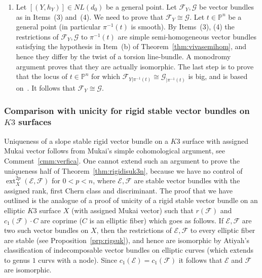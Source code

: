 \documentclass[11pt]{amsart}
\newcommand{\PP}{{\mathbb P}}
\let\mathcal\mathscr
\def\cE{\mathcal{E}}
\def\cF{\mathcal{F}}
\def\cG{\mathcal{G}}
\DeclareMathOperator{\ext}{ext}
\theoremstyle{definition}
\theoremstyle{remark}
\begin{document}
\begin{enumerate}
%
\item
%
Let $[(Y,h_Y)]\in NL(d_0)$ be a general point. Let $\cF_Y,\cG$ be vector bundles  as in Items~(3) and~(4). We need to  prove that $\cF_Y\cong\cG$. Let 
$t\in\PP^n$ be a general point (in particular $\pi^{-1}(t)$ is smooth). By Items~(3), (4) the restrictions of $\cF_Y,\cG$ to $\pi^{-1}(t)$ are simple semi-homogeneous vector bundles satisfying the hypothesis in Item~(b) of Theorem~\ref{thm:vivasemihom}, and hence they differ by the twist of a torsion line-bundle. A monodromy argument proves that they are actually isomorphic. 
The last step is to prove that the locus of $t\in\PP^n$ for which $\cF_{Y|\pi^{-1}(t)}\cong\cG_{|\pi^{-1}(t)}$ is big, and is based 
on~\cite[Lmm.~7.5]{og:fascimod}. It follows that  $\cF_Y\cong\cG$. 
%
\end{enumerate}
%



%
\subsubsection{Comparison with unicity for rigid stable vector bundles on $K3$ surfaces}
%
Uniqueness of a slope stable rigid vector bundle  on a $K3$ surface with assigned Mukai vector follows from Mukai's simple cohomological  argument,  see Comment~\ref{cmm:verfica}. One cannot  extend such an argument to prove the uniqueness half of Theorem~\ref{thm:rigidisuk3n}, because we have no control of $\ext^{2p}_X(\cE,\cF)$ for $0<p<n$, where $\cE,\cF$ are stable vector bundles with the assigned rank, first Chern class and discriminant. The proof that we have outlined is the analogue of  a proof of unicity of a rigid stable vector bundle  on an elliptic $K3$ surface $X$ (with assigned Mukai vector) such that $r(\cF)$ and $c_1(\cF)\cdot C$ are coprime ($C$ is an elliptic fiber) which goes as follows. If $\cE,\cF$ are two such vector bundles on $X$, then the restrictions of $\cE,\cF$ to every elliptic fiber are stable (see Proposition~\ref{prp:rigsuk}), and hence are isomorphic by Atiyah's classification of indecomposable vector bundles on elliptic curves (which extends to genus $1$ curvs with a node). Since $c_1(\cE)=c_1(\cF)$ it follows that $\cE$ and $\cF$ are isomorphic.
%
\end{document}
